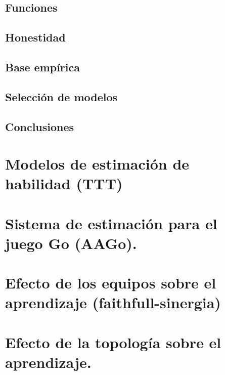 \documentclass[a4paper,10pt]{book}
\begin{document}
\newpage

\section{Funciones}

\section{Honestidad}

\section{Base empírica}

\section{Selección de modelos}

\section{Conclusiones}


\chapter{Modelos de estimación de habilidad (TTT)}

\chapter{Sistema de estimación para el juego Go (AAGo).}

\chapter{Efecto de los equipos sobre el aprendizaje (faithfull-sinergia)}

\chapter{Efecto de la topología sobre el aprendizaje.}
\end{document}
